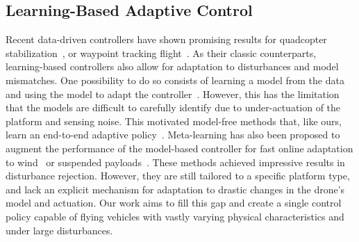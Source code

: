 


\subsection{Learning-Based Adaptive Control}

Recent data-driven controllers have shown promising results for quadcopter stabilization~\cite{hwangbo2017control,koch2019reinforcement}, or waypoint tracking flight~\cite{song2021autonomous, kaufmann2022benchmark}.
%
As their classic counterparts, learning-based controllers also allow for adaptation to disturbances and model mismatches.
%
One possibility to do so consists of learning a model from the data and using the model to adapt the controller~\cite{lambert2019low,shi2019neural,belkhale2021model,torrente2021data}.
%
However, this has the limitation that the models are difficult to carefully identify due to under-actuation of the platform and sensing noise.
%
This motivated model-free methods that, like ours, learn an end-to-end adaptive policy~\cite{pi2021robust}.
%
Meta-learning has also been proposed to augment the performance of the model-based controller for fast online adaptation to wind~\cite{neuralfly} or suspended payloads~\cite{belkhale2021model}. 
%
These methods achieved impressive results in disturbance rejection.
%
However, they are still tailored to a specific platform type, and lack an explicit mechanism for adaptation to drastic changes in the drone's model and actuation.
%
Our work aims to fill this gap and create a single control policy capable of flying vehicles with vastly varying physical characteristics and under large disturbances.
%





